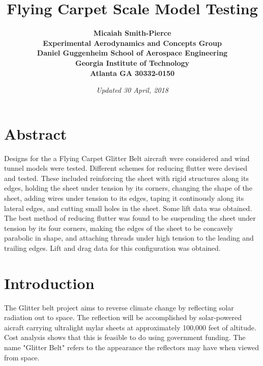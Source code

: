 \documentclass[12pt]{report} %
\title{\bf Flying Carpet Scale Model Testing\\  }
\author{\bf Micaiah Smith-Pierce
\\ Experimental Aerodynamics and Concepts Group
\\Daniel Guggenheim School of Aerospace Engineering
\\Georgia Institute of Technology
\\Atlanta GA 30332-0150
}
\date{\it Updated 30 April, 2018} %
\begin{document}
\maketitle
 
\tableofcontents
 
\chapter{Abstract}

Designs for the a Flying Carpet Glitter Belt aircraft were considered and wind tunnel models were tested. Different schemes for reducing flutter
were devised and tested. These included
reinforcing the sheet with rigid structures along its edges, holding the sheet under tension by its corners, changing the shape of the
sheet, adding wires under tension to its edges, taping it continously along its lateral edges, and cutting small holes in the sheet.
Some lift data was obtained. The best method of
reducing flutter was found to be suspending the sheet under tension by its four corners, making the edges of the sheet to be concavely
parabolic in shape, and attaching threads under high tension to the leading and trailing edges. Lift and drag data for this configuration was
obtained.

\chapter{Introduction}

The Glitter belt project aims to reverse climate change by reflecting solar radiation out to space.  The reflection will be accomplished
by solar-powered aicraft carrying ultralight mylar sheets at approximately 100,000 feet of altitude.  Cost analysis shows that this is
feasible to do using government funding.  The name "Glitter Belt" refers to the appearance the reflectors may have when viewed from space.
\end{document}
